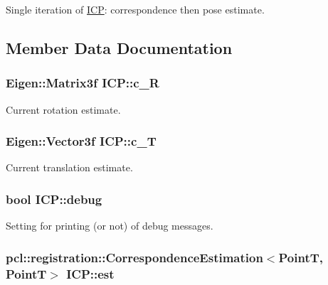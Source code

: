 \-Single iteration of \hyperlink{classICP}{\-I\-C\-P}\-: correspondence then pose estimate. 



\subsection{\-Member \-Data \-Documentation}
\hypertarget{classICP_aee085ec283f657cb3980c529d48ba65b}{
\subsubsection[{c\-\_\-\-R}]{\setlength{\rightskip}{0pt plus 5cm}\-Eigen\-::\-Matrix3f {\bf \-I\-C\-P\-::c\-\_\-\-R}}}\label{classICP_aee085ec283f657cb3980c529d48ba65b}


\-Current rotation estimate. 

\hypertarget{classICP_a55de298290d8e74617fdf19c153d55be}{
\subsubsection[{c\-\_\-\-T}]{\setlength{\rightskip}{0pt plus 5cm}\-Eigen\-::\-Vector3f {\bf \-I\-C\-P\-::c\-\_\-\-T}}}\label{classICP_a55de298290d8e74617fdf19c153d55be}


\-Current translation estimate. 

\hypertarget{classICP_a6e81d1444353ba66d59cd16d2dc74d7c}{
\subsubsection[{debug}]{\setlength{\rightskip}{0pt plus 5cm}bool {\bf \-I\-C\-P\-::debug}}}\label{classICP_a6e81d1444353ba66d59cd16d2dc74d7c}


\-Setting for printing (or not) of debug messages. 

\hypertarget{classICP_acf6194ebbf168e4a6059945980752849}{
\subsubsection[{est}]{\setlength{\rightskip}{0pt plus 5cm}pcl\-::registration\-::\-Correspondence\-Estimation$<${\bf \-Point\-T}, {\bf \-Point\-T}$>$ {\bf \-I\-C\-P\-::est}}}\label{classICP_acf6194ebbf168e4a6059945980752849}


